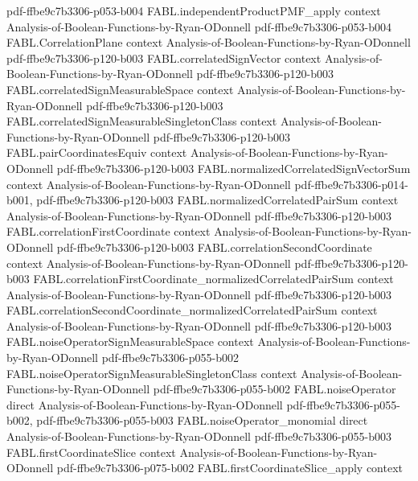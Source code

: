 \begin{theorem}
  {pdf-ffbe9c7b3306-p053-b004}
\proofstep
  {FABL.independentProductPMF_apply}
  {context}
  {Analysis-of-Boolean-Functions-by-Ryan-ODonnell}
  {pdf-ffbe9c7b3306-p053-b004}
\proofstep
  {FABL.CorrelationPlane}
  {context}
  {Analysis-of-Boolean-Functions-by-Ryan-ODonnell}
  {pdf-ffbe9c7b3306-p120-b003}
\proofstep
  {FABL.correlatedSignVector}
  {context}
  {Analysis-of-Boolean-Functions-by-Ryan-ODonnell}
  {pdf-ffbe9c7b3306-p120-b003}
\proofstep
  {FABL.correlatedSignMeasurableSpace}
  {context}
  {Analysis-of-Boolean-Functions-by-Ryan-ODonnell}
  {pdf-ffbe9c7b3306-p120-b003}
\proofstep
  {FABL.correlatedSignMeasurableSingletonClass}
  {context}
  {Analysis-of-Boolean-Functions-by-Ryan-ODonnell}
  {pdf-ffbe9c7b3306-p120-b003}
\proofstep
  {FABL.pairCoordinatesEquiv}
  {context}
  {Analysis-of-Boolean-Functions-by-Ryan-ODonnell}
  {pdf-ffbe9c7b3306-p120-b003}
\proofstep
  {FABL.normalizedCorrelatedSignVectorSum}
  {context}
  {Analysis-of-Boolean-Functions-by-Ryan-ODonnell}
  {pdf-ffbe9c7b3306-p014-b001,
    pdf-ffbe9c7b3306-p120-b003}
\proofstep
  {FABL.normalizedCorrelatedPairSum}
  {context}
  {Analysis-of-Boolean-Functions-by-Ryan-ODonnell}
  {pdf-ffbe9c7b3306-p120-b003}
\proofstep
  {FABL.correlationFirstCoordinate}
  {context}
  {Analysis-of-Boolean-Functions-by-Ryan-ODonnell}
  {pdf-ffbe9c7b3306-p120-b003}
\proofstep
  {FABL.correlationSecondCoordinate}
  {context}
  {Analysis-of-Boolean-Functions-by-Ryan-ODonnell}
  {pdf-ffbe9c7b3306-p120-b003}
\proofstep
  {FABL.correlationFirstCoordinate_normalizedCorrelatedPairSum}
  {context}
  {Analysis-of-Boolean-Functions-by-Ryan-ODonnell}
  {pdf-ffbe9c7b3306-p120-b003}
\proofstep
  {FABL.correlationSecondCoordinate_normalizedCorrelatedPairSum}
  {context}
  {Analysis-of-Boolean-Functions-by-Ryan-ODonnell}
  {pdf-ffbe9c7b3306-p120-b003}
\proofstep
  {FABL.noiseOperatorSignMeasurableSpace}
  {context}
  {Analysis-of-Boolean-Functions-by-Ryan-ODonnell}
  {pdf-ffbe9c7b3306-p055-b002}
\proofstep
  {FABL.noiseOperatorSignMeasurableSingletonClass}
  {context}
  {Analysis-of-Boolean-Functions-by-Ryan-ODonnell}
  {pdf-ffbe9c7b3306-p055-b002}
\proofstep
  {FABL.noiseOperator}
  {direct}
  {Analysis-of-Boolean-Functions-by-Ryan-ODonnell}
  {pdf-ffbe9c7b3306-p055-b002,
    pdf-ffbe9c7b3306-p055-b003}
\proofstep
  {FABL.noiseOperator_monomial}
  {direct}
  {Analysis-of-Boolean-Functions-by-Ryan-ODonnell}
  {pdf-ffbe9c7b3306-p055-b003}
\proofstep
  {FABL.firstCoordinateSlice}
  {context}
  {Analysis-of-Boolean-Functions-by-Ryan-ODonnell}
  {pdf-ffbe9c7b3306-p075-b002}
\proofstep
  {FABL.firstCoordinateSlice_apply}
  {context}

\end{theorem}
